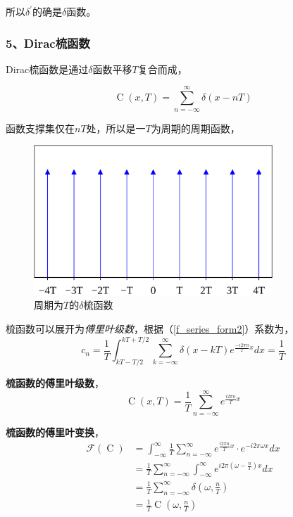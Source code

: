 		所以$\delta^\prime$的确是$\delta$函数。

	\subsubsection*{5、Dirac梳函数}

		Dirac梳函数是通过$\delta$函数平移$T$复合而成，

		\begin{equation}
			\mathop{C}(x,T) = \sum_{n=-\infty}^{\infty} \delta(x-nT) \label{dirac_comb}
		\end{equation}

		函数支撑集仅在$nT$处，所以是一$T$为周期的周期函数，

		\begin{figure}[H]
			\begin{center}
				\includegraphics[width=0.8\textwidth]{./images/dirac_comb.png}
			\end{center}
			\caption{周期为$T$的$\delta$梳函数}
		\end{figure}

		梳函数可以展开为\textit{傅里叶级数}，根据（\ref{f_series_form2}）系数为，
		$$
			c_n = \frac{1}{T}\int_{kT-T/2}^{kT+T/2}
				\sum_{k=-\infty}^{\infty} \delta(x-kT)e^{\frac{-i2\pi n}{T}x}dx = \frac{1}{T}
		$$

		\textbf{梳函数的傅里叶级数}，
		\begin{equation}
			\mathop{C}(x,T) =\frac{1}{T} \sum_{n=-\infty}^{\infty} e^{\frac{i2\pi n}{T}x} \label{delta_f_series}
		\end{equation}

		\textbf{梳函数的傅里叶变换}，
		\begin{align*}
			\mathcal{F}(\mathop{C(x,T)}) 
				&= \int_{-\infty}^{\infty} \frac{1}{T} \sum_{n=-\infty}^{\infty} e^{\frac{i2\pi n}{T}x} \cdot  e^{-i2\pi\omega x}dx\\
				& = \frac{1}{T} \sum_{n=-\infty}^{\infty} \int_{-\infty}^{\infty} e^{i2\pi(\omega - \frac{n}{T}) x}dx\\
				& = \frac{1}{T} \sum_{n=-\infty}^{\infty} \delta(\omega,\frac{n}{T})\\
				& = \frac{1}{T}\mathop{C}(\omega, \frac{n}{T})
		\end{align*}

